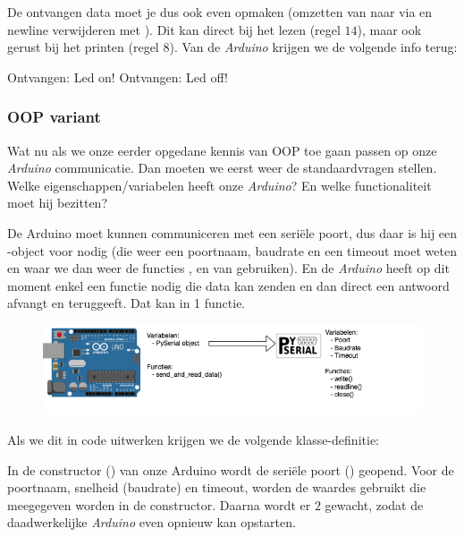 De ontvangen data moet je dus ook even opmaken (omzetten van  naar  via  en newline verwijderen met ). Dit kan direct bij het lezen (regel $14$), maar ook gerust bij het printen (regel $8$). Van de \textit{Arduino} krijgen we de volgende info terug:
\begin{python}
Ontvangen: Led on!
Ontvangen: Led off!
\end{python}

\newpage

\subsubsection{OOP variant}
Wat nu als we onze eerder opgedane kennis van OOP toe gaan passen op onze \textit{Arduino} communicatie. Dan moeten we eerst weer de standaardvragen stellen. Welke eigenschappen/variabelen heeft onze \textit{Arduino}? En welke functionaliteit moet hij bezitten? 

De Arduino moet kunnen communiceren met een seriële poort, dus daar is hij een -object voor nodig (die weer een poortnaam, baudrate en een timeout moet weten en waar we dan weer de functies ,  en  van gebruiken). En de \textit{Arduino} heeft op dit moment enkel een functie nodig die data kan zenden en dan direct een antwoord afvangt en teruggeeft. Dat kan in 1 functie.
\begin{figure}[h!]
\centering\includegraphics[scale=0.6]{Pictures/chapter08/arduino_oop.png}
\label{fig:arduino_oop} %
\end{figure}

Als we dit in code uitwerken krijgen we de volgende klasse-definitie:

In de constructor () van onze Arduino wordt de seriële poort () geopend. Voor de poortnaam, snelheid (baudrate) en timeout, worden de waardes gebruikt die meegegeven worden in de constructor. Daarna wordt er $2$ gewacht, zodat de daadwerkelijke \textit{Arduino} even opnieuw kan opstarten. 

